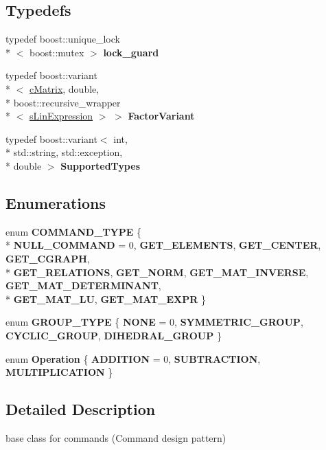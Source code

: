 \subsection*{Typedefs}
\begin{DoxyCompactItemize}
\item 
\hypertarget{namespaceengine_af1b349928e8ef52af7a7b83676140e9d}{typedef boost\-::unique\-\_\-lock\\*
$<$ boost\-::mutex $>$ {\bfseries lock\-\_\-guard}}\label{namespaceengine_af1b349928e8ef52af7a7b83676140e9d}

\item 
\hypertarget{namespaceengine_a6596ece313a7134d3129d5385aebd33e}{typedef boost\-::variant\\*
$<$ \hyperlink{structengine_1_1cMatrix}{c\-Matrix}, double, \\*
boost\-::recursive\-\_\-wrapper\\*
$<$ \hyperlink{structengine_1_1sLinExpression}{s\-Lin\-Expression} $>$ $>$ {\bfseries Factor\-Variant}}\label{namespaceengine_a6596ece313a7134d3129d5385aebd33e}

\item 
\hypertarget{namespaceengine_a942a6c5eb4358a465a03cbf32bd4546e}{typedef boost\-::variant$<$ int, \\*
std\-::string, std\-::exception, \\*
double $>$ {\bfseries Supported\-Types}}\label{namespaceengine_a942a6c5eb4358a465a03cbf32bd4546e}

\end{DoxyCompactItemize}
\subsection*{Enumerations}
\begin{DoxyCompactItemize}
\item 
enum {\bfseries C\-O\-M\-M\-A\-N\-D\-\_\-\-T\-Y\-P\-E} \{ \\*
{\bfseries N\-U\-L\-L\-\_\-\-C\-O\-M\-M\-A\-N\-D} =  0, 
{\bfseries G\-E\-T\-\_\-\-E\-L\-E\-M\-E\-N\-T\-S}, 
{\bfseries G\-E\-T\-\_\-\-C\-E\-N\-T\-E\-R}, 
{\bfseries G\-E\-T\-\_\-\-C\-G\-R\-A\-P\-H}, 
\\*
{\bfseries G\-E\-T\-\_\-\-R\-E\-L\-A\-T\-I\-O\-N\-S}, 
{\bfseries G\-E\-T\-\_\-\-N\-O\-R\-M}, 
{\bfseries G\-E\-T\-\_\-\-M\-A\-T\-\_\-\-I\-N\-V\-E\-R\-S\-E}, 
{\bfseries G\-E\-T\-\_\-\-M\-A\-T\-\_\-\-D\-E\-T\-E\-R\-M\-I\-N\-A\-N\-T}, 
\\*
{\bfseries G\-E\-T\-\_\-\-M\-A\-T\-\_\-\-L\-U}, 
{\bfseries G\-E\-T\-\_\-\-M\-A\-T\-\_\-\-E\-X\-P\-R}
 \}
\item 
enum {\bfseries G\-R\-O\-U\-P\-\_\-\-T\-Y\-P\-E} \{ {\bfseries N\-O\-N\-E} =  0, 
{\bfseries S\-Y\-M\-M\-E\-T\-R\-I\-C\-\_\-\-G\-R\-O\-U\-P}, 
{\bfseries C\-Y\-C\-L\-I\-C\-\_\-\-G\-R\-O\-U\-P}, 
{\bfseries D\-I\-H\-E\-D\-R\-A\-L\-\_\-\-G\-R\-O\-U\-P}
 \}
\item 
enum {\bfseries Operation} \{ {\bfseries A\-D\-D\-I\-T\-I\-O\-N} =  0, 
{\bfseries S\-U\-B\-T\-R\-A\-C\-T\-I\-O\-N}, 
{\bfseries M\-U\-L\-T\-I\-P\-L\-I\-C\-A\-T\-I\-O\-N}
 \}
\end{DoxyCompactItemize}


\subsection{Detailed Description}
base class for commands (Command design pattern) 